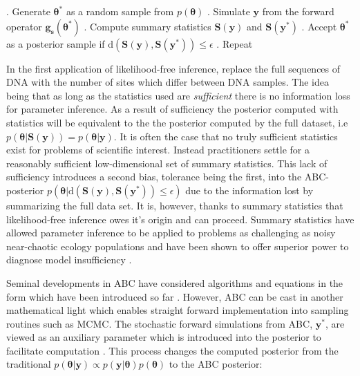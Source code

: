 \begin{algorithm}[H]
	\caption{ }
	\begin{algorithmic}
		. Generate $\bm{\theta^*}$ as a random sample from $p(\bm{\theta})$		
		. Simulate $\bm{y}$ from the forward operator $\bm{g_s}(\bm{\theta^*})$		
		. Compute summary statistics $\bm{S}(\bm{y})$ and $\bm{S}(\bm{y^*})$		
		. Accept $\bm{\theta^*}$ as a posterior sample if $\text{d}(\bm{S}(\bm{y}),\bm{S}(\bm{y^*}))\leq\epsilon$		
		. Repeat
	\end{algorithmic}
	\label{ABCrejectionsampler}
\end{algorithm}

In the first application of likelihood-free inference, \citet{Tavare1997} replace the full sequences of DNA with the number of sites which differ between DNA samples. The idea being that as long as the statistics used are \textit{sufficient} there is no information loss for parameter inference. As a result of sufficiency the posterior computed with statistics will be equivalent to the the posterior computed by the full dataset, i.e $p(\bm{\theta}|\bm{S}(\bm{y})) = p(\bm{\theta}|\bm{y})$. It is often the case that no truly sufficient statistics exist for problems of scientific interest. Instead practitioners settle for a reasonably sufficient low-dimensional set of summary statistics. This lack of sufficiency introduces a second bias, tolerance being the first, into the ABC-posterior $p(\bm{\theta}|\text{d}(\bm{S}(\bm{y}),\bm{S}(\bm{y^*}))\leq\epsilon)$ due to the information lost by summarizing the full data set. It is, however, thanks to summary statistics that likelihood-free inference owes it's origin and can proceed. Summary statistics have allowed parameter inference to be applied to problems as challenging as noisy near-chaotic ecology populations \citep{Wood2010} and have been shown to offer superior power to diagnose model insufficiency \citep{Ratmann2009,vrugt2013toward}.\par

Seminal developments in ABC have considered algorithms and equations in the form which have been introduced so far \citep{Fu1997,Pritchard1999a,Beaumont2002,Marjoram2003}. However, ABC can be cast in another mathematical light which enables straight forward implementation into sampling routines such as MCMC. The stochastic forward simulations from ABC, $\bm{y^*}$, are viewed as an auxiliary parameter which is introduced into the posterior to facilitate computation \citep{Sisson2010a}. This process changes the computed posterior from the traditional $p(\bm{\theta}|\bm{y}) \propto p(\bm{y}|\bm{\theta})p(\bm{\theta})$ to the ABC posterior:

